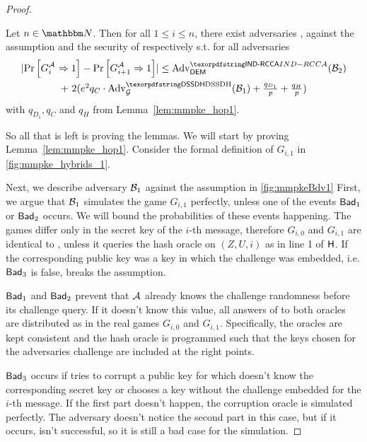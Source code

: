 \begin{proof}
  \begin{corollary}\label{cor:mmpke3}
    Let $n\in\N$. Then for all $1\leq i \le n$, there exist adversaries \Bdv[1], \Bdv[2] against the \sdh assumption and
    the \indrcca security of \dem respectively s.t. for all adversaries \Adv
    \begin{multline*}
      \abs{\Pr\left[G_i^{\Adv}\Rightarrow 1\right] - \Pr\left[G_{i+1}^{\Adv}\Rightarrow 1\right]} \leq  \adv{\indrcca}{\dem}({\Bdv[2]}) \\
      \begin{array}{c}
        +\ 2(e^2q_C\cdot\adv{\sdh}{\Group}({\Bdv[1]}) + \frac{q_{D_1}}{p} + \frac{q_H}{p}) \\
      \end{array}
    \end{multline*}
    with $q_{D_1}, q_C$ and $q_H$ from Lemma~\ref{lem:mmpke_hop1}.
  \end{corollary}

  So all that is left is proving the lemmas.
  We will start by proving Lemma~\ref{lem:mmpke_hop1}. Consider the formal definition of $G_{i,1}$ in \cref{fig:mmpke_hybrids_1}.
  

  Next, we describe adversary $\Bdv[1]$ against the \sdh assumption in \cref{fig:mmpkeBdv1}
  First, we argue that $\Bdv[1]$ simulates the game $G_{i,1}$ perfectly, unless one of the events $\term{Bad}_1$ or
  $\term{Bad}_2$ occurs. We will bound the probabilities of these events happening. The games differ only in the
  secret key of the $i$-th message, therefore $G_{i,0}$ and $G_{i,1}$ are identical to
  \Adv, unless it queries the hash oracle on $(Z, U, i)$ as in line 1 of $\term{H}$. If the
  corresponding public key was a key in which the challenge was embedded, i.e. $\term{Bad}_3$ is false, \Bdv[1] breaks
  the \sdh assumption.

  $\term{Bad}_1$ and $\term{Bad}_2$ prevent that $\Adv$ already knows the challenge randomness before its challenge
  query. If it doesn't know this value, all answers of \Bdv[1] to both oracles are distributed as in the real games $G_{i,0}$
  and $G_{i,1}$. Specifically, the oracles are kept consistent and the hash oracle is programmed such that the keys chosen
  for the adversaries challenge are included at the right points.

  $\term{Bad}_3$ occurs if \Adv tries to corrupt a public key for which \Bdv[1] doesn't know the corresponding secret
  key or \Adv chooses a key without the challenge embedded for the $i$-th message. If the first part doesn't happen, the
  corruption oracle is simulated perfectly. The adversary doesn't notice the second part in this case, but if it occurs,
  \Bdv[1] isn't successful, so it is still a bad case for the simulation.


\end{proof}
